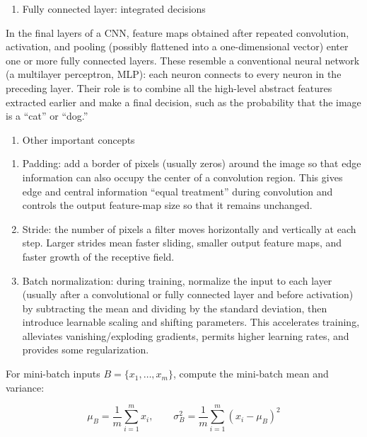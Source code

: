 \begin{enumerate}
\def\labelenumi{\arabic{enumi}.}
\setcounter{enumi}{3}
\tightlist
\item
  Fully connected layer: integrated decisions
\end{enumerate}

In the final layers of a CNN, feature maps obtained after repeated convolution, activation, and pooling (possibly flattened into a one-dimensional vector) enter one or more fully connected layers. These resemble a conventional neural network (a multilayer perceptron, MLP): each neuron connects to every neuron in the preceding layer. Their role is to combine all the high-level abstract features extracted earlier and make a final decision, such as the probability that the image is a ``cat'' or ``dog.''

\begin{enumerate}
\def\labelenumi{\arabic{enumi}.}
\setcounter{enumi}{4}
\tightlist
\item
  Other important concepts
\end{enumerate}

\begin{enumerate}
\def\labelenumi{(\arabic{enumi})}
\item
  Padding: add a border of pixels (usually zeros) around the image so that edge information can also occupy the center of a convolution region. This gives edge and central information ``equal treatment'' during convolution and controls the output feature-map size so that it remains unchanged.
\item
  Stride: the number of pixels a filter moves horizontally and vertically at each step. Larger strides mean faster sliding, smaller output feature maps, and faster growth of the receptive field.
\item
  Batch normalization: during training, normalize the input to each layer (usually after a convolutional or fully connected layer and before activation) by subtracting the mean and dividing by the standard deviation, then introduce learnable scaling and shifting parameters. This accelerates training, alleviates vanishing/exploding gradients, permits higher learning rates, and provides some regularization.
\end{enumerate}

For mini-batch inputs \(B=\{x_1,\ldots,x_m\}\), compute the mini-batch mean and variance:

\[
\mu_B=\frac{1}{m}\sum_{i=1}^{m}x_i,\qquad
\sigma_B^2=\frac{1}{m}\sum_{i=1}^{m}(x_i-\mu_B)^2
\]

